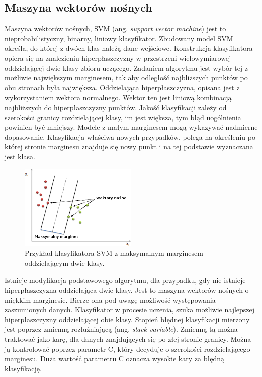 \subsection{Maszyna wektorów nośnych}
Maszyna wektorów nośnych, SVM (ang. \textit{support vector machine}) jest to nieprobabilistyczny, binarny, liniowy klasyfikator. Zbudowany model SVM określa, do której z dwóch klas należą dane wejściowe. Konstrukcja klasyfikatora opiera się na znalezieniu hiperpłaszczyzny  w przestrzeni wielowymiarowej oddzielającej dwie klasy zbioru uczącego. Zadaniem algorytmu jest wybór tej z możliwie największym marginesem, tak aby odległość najbliższych punktów po obu stronach była największa. Oddzielająca hiperpłaszczyzna, opisana jest z wykorzystaniem wektora normalnego. Wektor ten jest liniową kombinacją najbliższych do hiperpłaszczyzny punktów. Jakość klasyfikacji zależy od szerokości granicy rozdzielającej klasy, im jest większa, tym błąd uogólnienia powinien być mniejszy. Modele z małym marginesem mogą wykazywać nadmierne dopasowanie. Klasyfikacja właściwa nowych przypadków, polega na określeniu po której stronie marginesu znajduje się nowy punkt i na tej podstawie wyznaczana jest klasa. \par
\begin{figure}[H]
	\centering
	\includegraphics[width=0.5\textwidth]{./images/svm.png}
	\caption[Przykład klasyfikatora SVM]{Przykład klasyfikatora SVM z maksymalnym marginesem oddzielającym dwie klasy.}
	\label{fig:klassvm}
\end{figure}
Istnieje modyfikacja podstawowego algorytmu, dla przypadku, gdy nie istnieje hiperpłaszczyzna oddzielająca dwie klasy. Jest to maszyna wektorów nośnych o miękkim marginesie. Bierze ona pod uwagę możliwość występowania zaszumionych danych. Klasyfikator w procesie uczenia, szuka możliwie najlepszej hiperpłaszczyzny oddzielającej obie klasy. Stopień błędnej klasyfikacji mierzony jest poprzez zmienną rozluźniającą (ang. \textit{slack variable}). Zmienną tą można traktować jako karę, dla danych znajdujących się po złej stronie granicy. Można ją kontrolować poprzez parametr C, który decyduje o szerokości rozdzielającego marginesu. Duża wartość parametru C oznacza wysokie kary za błędną klasyfikację. \par
